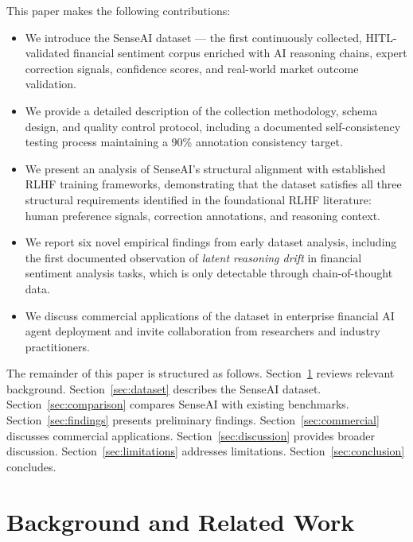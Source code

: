 \documentclass[11pt,a4paper]{article}
\begin{document}
This paper makes the following contributions:

\begin{itemize}[leftmargin=1.8em, itemsep=4pt]
  \item We introduce the SenseAI dataset --- the first continuously collected,
        HITL-validated financial sentiment corpus enriched with AI reasoning chains,
        expert correction signals, confidence scores, and real-world market outcome
        validation.
  \item We provide a detailed description of the collection methodology, schema design,
        and quality control protocol, including a documented self-consistency testing
        process maintaining a 90\% annotation consistency target.
  \item We present an analysis of SenseAI's structural alignment with established RLHF
        training frameworks, demonstrating that the dataset satisfies all three structural
        requirements identified in the foundational RLHF literature: human preference
        signals, correction annotations, and reasoning context.
  \item We report six novel empirical findings from early dataset analysis, including
        the first documented observation of \textit{latent reasoning drift} in financial
        sentiment analysis tasks, which is only detectable through chain-of-thought data.
  \item We discuss commercial applications of the dataset in enterprise financial AI
        agent deployment and invite collaboration from researchers and industry
        practitioners.
\end{itemize}

The remainder of this paper is structured as follows. Section~\ref{sec:background}
reviews relevant background. Section~\ref{sec:dataset} describes the SenseAI
dataset. Section~\ref{sec:comparison} compares SenseAI with existing benchmarks.
Section~\ref{sec:findings} presents preliminary findings.
Section~\ref{sec:commercial} discusses commercial applications.
Section~\ref{sec:discussion} provides broader discussion.
Section~\ref{sec:limitations} addresses limitations. Section~\ref{sec:conclusion}
concludes.

\section{Background and Related Work}
\label{sec:background}
\end{document}
